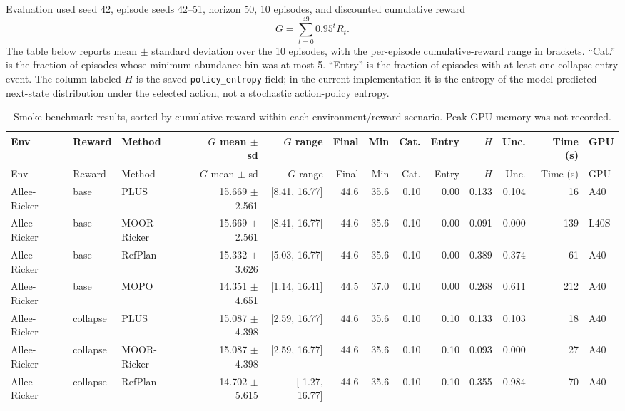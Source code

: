 \documentclass[11pt]{article}
\begin{document}
Evaluation used seed 42, episode seeds 42--51, horizon 50, 10 episodes, and
discounted cumulative reward
\[
    G = \sum_{t=0}^{49} 0.95^t R_t .
\]
The table below reports mean $\pm$ standard deviation over the 10 episodes,
with the per-episode cumulative-reward range in brackets. ``Cat.'' is the
fraction of episodes whose minimum abundance bin was at most 5. ``Entry'' is
the fraction of episodes with at least one collapse-entry event. The column
labeled $H$ is the saved \texttt{policy\_entropy} field; in the current
implementation it is the entropy of the model-predicted next-state
distribution under the selected action, not a stochastic action-policy entropy.

\begin{landscape}
\begin{scriptsize}
\setlength{\tabcolsep}{3pt}
\begin{longtable}{lllrrrrrrrrrl}
\caption{Smoke benchmark results, sorted by cumulative reward within each
environment/reward scenario. Peak GPU memory was not recorded.}\\
\toprule
Env & Reward & Method & $G$ mean $\pm$ sd & $G$ range & Final & Min & Cat. & Entry & $H$ & Unc. & Time (s) & GPU \\
\midrule
\endfirsthead
\toprule
Env & Reward & Method & $G$ mean $\pm$ sd & $G$ range & Final & Min & Cat. & Entry & $H$ & Unc. & Time (s) & GPU \\
\midrule
\endhead
Allee-Ricker & base & PLUS & 15.669 $\pm$ 2.561 & [8.41, 16.77] & 44.6 & 35.6 & 0.10 & 0.00 & 0.133 & 0.104 & 16 & A40 \\
Allee-Ricker & base & MOOR-Ricker & 15.669 $\pm$ 2.561 & [8.41, 16.77] & 44.6 & 35.6 & 0.10 & 0.00 & 0.091 & 0.000 & 139 & L40S \\
Allee-Ricker & base & RefPlan & 15.332 $\pm$ 3.626 & [5.03, 16.77] & 44.6 & 35.6 & 0.10 & 0.00 & 0.389 & 0.374 & 61 & A40 \\
Allee-Ricker & base & MOPO & 14.351 $\pm$ 4.651 & [1.14, 16.41] & 44.5 & 37.0 & 0.10 & 0.00 & 0.268 & 0.611 & 212 & A40 \\
\midrule
Allee-Ricker & collapse & PLUS & 15.087 $\pm$ 4.398 & [2.59, 16.77] & 44.6 & 35.6 & 0.10 & 0.10 & 0.133 & 0.103 & 18 & A40 \\
Allee-Ricker & collapse & MOOR-Ricker & 15.087 $\pm$ 4.398 & [2.59, 16.77] & 44.6 & 35.6 & 0.10 & 0.10 & 0.093 & 0.000 & 27 & A40 \\
Allee-Ricker & collapse & RefPlan & 14.702 $\pm$ 5.615 & [-1.27, 16.77] & 44.6 & 35.6 & 0.10 & 0.10 & 0.355 & 0.984 & 70 & A40 \\

\end{longtable}
\end{scriptsize}
\end{landscape}
\end{document}
